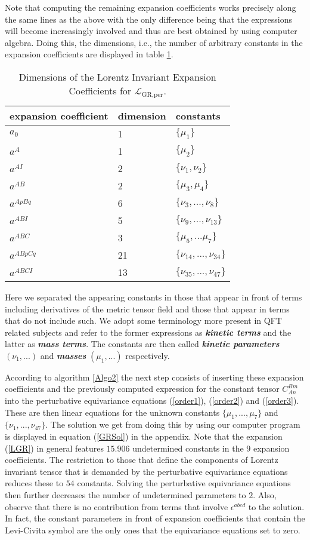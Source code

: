 Note that computing the remaining expansion coefficients works precisely along the same lines as the above with the only difference being that the expressions will become increasingly involved and thus are best obtained by using computer algebra.
Doing this, the dimensions, i.e., the number of arbitrary constants in the expansion coefficients are displayed in table \ref{GRExp}.
\begin{table}
\centering 
\begin{tabular}{lll}\toprule
    expansion coefficient & dimension & constants   \\ \midrule
    $a_0$ & 1 & $\{\mu_1\}$ \\
    $a^A$ & 1 & $\{\mu_2\}$ \\
    $a^{AI}$ & 2 & $\{\nu_1, \nu_2\}$ \\
    $a^{AB}$ & 2 & $\{\mu_3, \mu_4 \} $ \\
    $a^{ApBq}$ & 6 & $\{\nu_3,...,\nu_8\}$ \\
    $a^{ABI}$ & 5 & $\{ \nu_9,...,\nu_{13} \}$ \\
    $a^{ABC}$ & 3 & $\{ \mu_5,...\mu_7 \}$\\
    $a^{ABpCq}$ & 21 & $\{\nu_{14},...,\nu_{34} \}$ \\
    $a^{ABCI}$ & 13 & $\{ \nu_{35},...,\nu_{47}\}$\\ \bottomrule
\end{tabular}
\caption{Dimensions of the Lorentz Invariant Expansion Coefficients for $\mathcal{L}_{\text{GR,per}}$.}\label{GRExp}
\end{table}
Here we separated the appearing constants in those that appear in front of terms including derivatives of the metric tensor field and those that appear in terms that do not include such. We adopt some terminology more present in QFT related subjects and refer to the former expressions as \textbf{\textit{kinetic terms}} and the latter as \textit{\textbf{mass terms}}. The constants are then called \textit{\textbf{kinetic parameters}} $(\nu_1,...)$ and \textit{\textbf{masses}} $(\mu_1,...)$ respectively.   

According to algorithm \ref{Algo2} the next step consists of inserting these expansion coefficients and the previously computed expression for the constant tensor $C_{An}^{Bm}$ into the perturbative equivariance equations (\ref{order1}), (\ref{order2}) and (\ref{order3}). These are then linear equations for the unknown constants $\{ \mu_1,...,\mu_7\}$ and $\{\nu_1,...,\nu_{47}\}$. The solution we get from doing this by using our computer program is displayed in equation (\ref{GRSol}) in the appendix. Note that the expansion (\ref{LGR}) in general features $15.906$ undetermined constants in the $9$ expansion coefficients. The restriction to those that define the components of Lorentz invariant tensor that is demanded by the perturbative equivariance equations reduces these to $54$ constants. Solving the perturbative equivariance equations then further decreases the number of undetermined parameters to $2$. Also, observe that there is no contribution from terms that involve $\epsilon^{abcd}$ to the solution. In fact, the constant parameters in front of expansion coefficients that contain the Levi-Civita symbol are the only ones that the equivariance equations set to zero.  

